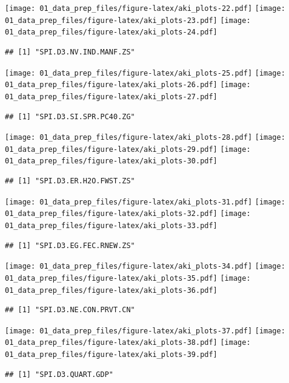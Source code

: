 \documentclass[]{article}
\begin{document}
\texttt{[image: 01\_data\_prep\_files/figure-latex/aki\_plots-22.pdf]}
\texttt{[image: 01\_data\_prep\_files/figure-latex/aki\_plots-23.pdf]}
\texttt{[image: 01\_data\_prep\_files/figure-latex/aki\_plots-24.pdf]}

\begin{verbatim}
## [1] "SPI.D3.NV.IND.MANF.ZS"
\end{verbatim}

\texttt{[image: 01\_data\_prep\_files/figure-latex/aki\_plots-25.pdf]}
\texttt{[image: 01\_data\_prep\_files/figure-latex/aki\_plots-26.pdf]}
\texttt{[image: 01\_data\_prep\_files/figure-latex/aki\_plots-27.pdf]}

\begin{verbatim}
## [1] "SPI.D3.SI.SPR.PC40.ZG"
\end{verbatim}

\texttt{[image: 01\_data\_prep\_files/figure-latex/aki\_plots-28.pdf]}
\texttt{[image: 01\_data\_prep\_files/figure-latex/aki\_plots-29.pdf]}
\texttt{[image: 01\_data\_prep\_files/figure-latex/aki\_plots-30.pdf]}

\begin{verbatim}
## [1] "SPI.D3.ER.H2O.FWST.ZS"
\end{verbatim}

\texttt{[image: 01\_data\_prep\_files/figure-latex/aki\_plots-31.pdf]}
\texttt{[image: 01\_data\_prep\_files/figure-latex/aki\_plots-32.pdf]}
\texttt{[image: 01\_data\_prep\_files/figure-latex/aki\_plots-33.pdf]}

\begin{verbatim}
## [1] "SPI.D3.EG.FEC.RNEW.ZS"
\end{verbatim}

\texttt{[image: 01\_data\_prep\_files/figure-latex/aki\_plots-34.pdf]}
\texttt{[image: 01\_data\_prep\_files/figure-latex/aki\_plots-35.pdf]}
\texttt{[image: 01\_data\_prep\_files/figure-latex/aki\_plots-36.pdf]}

\begin{verbatim}
## [1] "SPI.D3.NE.CON.PRVT.CN"
\end{verbatim}

\texttt{[image: 01\_data\_prep\_files/figure-latex/aki\_plots-37.pdf]}
\texttt{[image: 01\_data\_prep\_files/figure-latex/aki\_plots-38.pdf]}
\texttt{[image: 01\_data\_prep\_files/figure-latex/aki\_plots-39.pdf]}

\begin{verbatim}
## [1] "SPI.D3.QUART.GDP"
\end{verbatim}
\end{document}
